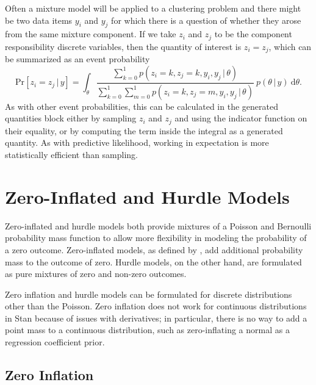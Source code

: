 Often a mixture model will be applied to a clustering problem and
there might be two data items $y_i$ and $y_j$ for which there is a
question of whether they arose from the same mixture component.  If we
take $z_i$ and $z_j$ to be the component responsibility discrete
variables, then the quantity of interest is $z_i = z_j$, which can be
summarized as an event probability
%
\[
\mbox{Pr}[z_i = z_j \, | \, y]
=
\int_{\theta}
\frac{\sum_{k=0}^1 p(z_i=k, z_j = k, y_i, y_j \, | \, \theta)}
     {\sum_{k=0}^1 \sum_{m=0}^1 p(z_i = k, z_j = m, y_i, y_j \, | \,
       \theta)}
\
p(\theta \, | \, y)
\
\mbox{d}\theta.
\]
%
As with other event probabilities, this can be calculated in the
generated quantities block either by sampling $z_i$ and $z_j$ and
using the indicator function on their equality, or by computing the
term inside the integral as a generated quantity.  As with predictive
likelihood, working in expectation is more statistically efficient than
sampling.

\section{Zero-Inflated and Hurdle Models}\label{zero-inflated.section}

Zero-inflated and hurdle models both provide mixtures of a Poisson and
Bernoulli probability mass function to allow more flexibility in
modeling the probability of a zero outcome.  Zero-inflated models, as
defined by \citet{Lambert:1992}, add additional probability mass to
the outcome of zero.  Hurdle models, on the other hand, are formulated
as pure mixtures of zero and non-zero outcomes.  

Zero inflation and hurdle models can be formulated for discrete
distributions other than the Poisson.  Zero inflation does not work
for continuous distributions in Stan because of issues with
derivatives; in particular, there is no way to add a point mass to a
continuous distribution, such as zero-inflating a normal as a
regression coefficient prior.


\subsection{Zero Inflation}

